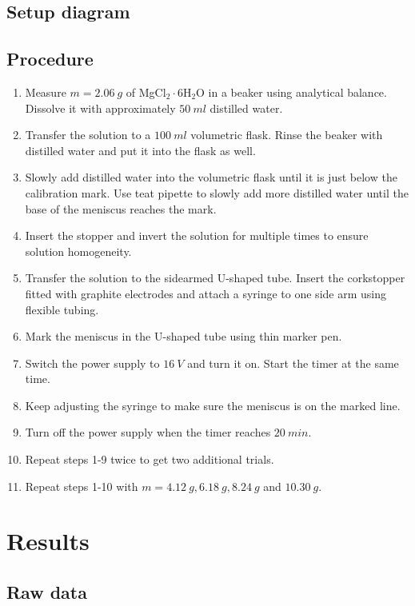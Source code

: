 \documentclass[a4paper]{article}
\begin{document}
\subsection{Setup diagram}

\subsection{Procedure}

\begin{enumerate}
    \item Measure $m=\SI{2.06}{g}$ of MgCl${}_2\cdot 6$H${}_2$O in a beaker using analytical balance. Dissolve it with approximately $\SI{50}{ml}$ distilled water.
    \item Transfer the solution to a $\SI{100}{ml}$ volumetric flask. Rinse the beaker with distilled water and put it into the flask as well.
    \item Slowly add distilled water into the volumetric flask until it is just below the calibration mark. Use teat pipette to slowly add more distilled water until the base of the meniscus reaches the mark.
    \item Insert the stopper and invert the solution for multiple times to ensure solution homogeneity.
    \item Transfer the solution to the sidearmed U-shaped tube. Insert the corkstopper fitted with graphite electrodes and attach a syringe to one side arm using flexible tubing.
    \item Mark the meniscus in the U-shaped tube using thin marker pen.
    \item Switch the power supply to $\SI{16}{V}$ and turn it on. Start the timer at the same time.
    \item Keep adjusting the syringe to make sure the meniscus is on the marked line.
    \item Turn off the power supply when the timer reaches $\SI{20}{min}$.
    \item Repeat steps 1-9 twice to get two additional trials.
    \item Repeat steps 1-10 with $m=\SI{4.12}{g},\SI{6.18}{g},\SI{8.24}{g}$ and $\SI{10.30}{g}$.
\end{enumerate}

\section{Results}

\subsection{Raw data}
\end{document}

